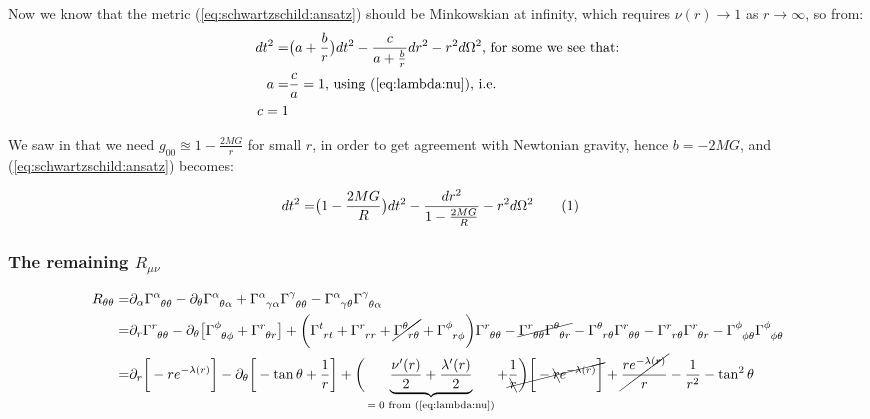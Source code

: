 \documentclass[]{article}
\newcommand\numberthis{\addtocounter{equation}{1}\tag{\theequation}}
\begin{document}
Now we know that the metric (\ref{eq:schwartzschild:ansatz}) should be Minkowskian at infinity, which requires $\nu(r)\rightarrow 1$ as $r \rightarrow \infty$, so from:
\begin{align*}
	dt^2 =& \big(a + \frac{b}{r}\big) dt^2 - \frac{c}{a + \frac{b}{r}} dr^2 -r^2 d  \Omega^2 \text{, for some we see that:}\\
	a =& \frac{c}{a}=1 \text{, using (\ref{eq:lambda:nu}), i.e.} \\
	c=1
\end{align*}

We saw in \cite[Lecture 5]{susskind2012general} that we need $g_{00}\approxeq1-\frac{2MG}{r}$ for small $r$, in order to get agreement with Newtonian gravity, hence $b=-2MG$, and (\ref{eq:schwartzschild:ansatz}) becomes:

\begin{align*}
	dt^2 =& \big(1-\frac{2MG}{R}\big) dt^2 - \frac{dr^2}{1-\frac{2MG}{R}}  -r^2 d  \Omega^2 \numberthis \label{eq:schwartzschild:solved}
\end{align*}

\subsubsection{The remaining $R_{\mu\nu}$}
\begin{align*}
	R_{\theta\theta} =& \partial_\alpha \Gamma\indices{^\alpha_{\theta\theta}} - \partial_\theta \Gamma\indices{^\alpha_{\theta\alpha}} + \Gamma\indices{^\alpha_{\gamma\alpha}} \Gamma\indices{^\gamma_{\theta\theta}} - \Gamma\indices{^\alpha_{\gamma\theta}} \Gamma\indices{^\gamma_{\theta\alpha}}\\
	=& \partial_r \Gamma\indices{^r_{\theta\theta}} - \partial_\theta \big[\Gamma\indices{^\phi_{\theta\phi}}+\Gamma\indices{^r_{\theta r}}\big] + \bigg(\Gamma\indices{^t_{rt}}+\Gamma\indices{^r_{rr}}+\cancel{\Gamma\indices{^\theta_{r\theta}}}+\Gamma\indices{^\phi_{r\phi}}\bigg) \Gamma\indices{^r_{\theta\theta}} -\cancel{ \Gamma\indices{^r_{\theta\theta}} \Gamma\indices{^\theta_{\theta r}}}  - \Gamma\indices{^\theta_{r\theta}} \Gamma\indices{^r_{\theta\theta}} -\Gamma\indices{^r_{r\theta}} \Gamma\indices{^r_{\theta r}} - \Gamma\indices{^\phi_{\phi\theta}} \Gamma\indices{^\phi_{\phi\theta}}\\
	=& \partial_r \bigg[-r  e^{-\lambda(r)}\bigg] - \partial_\theta \bigg[-\tan \theta +\frac{1}{r}\bigg]  + \bigg(\underbrace{\frac{\nu^\prime(r)}{2}+\frac{\lambda^\prime(r)}{2}}_\text{$=0$ from (\ref{eq:lambda:nu})}+\cancel{\frac{1}{\bcancel{r}}\bigg)\bigg[ -\bcancel{r}  e^{-\lambda(r)}\bigg]} + \cancel{\frac{r e^{-\lambda(r)}}{r}}	 -\frac{1}{r^2} - \tan^2 \theta 
\end{align*}
\end{document}
